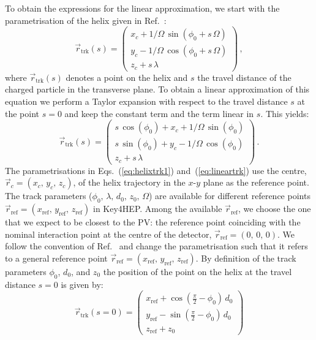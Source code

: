 \documentclass[a4paper,english,11pt]{article}
\newcommand{\trk}{\ensuremath{\textrm{trk}}\xspace}
\newcommand{\refpt}{\ensuremath{\textrm{ref}}\xspace}
\begin{document}
	To obtain the expressions for the linear approximation, we start with the parametrisation of the helix given in Ref.~\cite{Kuhr:1998jk}:
	\begin{equation}
		\vec{r}_{\trk}(s) = \begin{pmatrix}
			x_c + 1/\Omega \, \sin(\phi_0 + s \, \Omega) \\
			y_c - 1/\Omega \, \cos(\phi_0 + s \, \Omega) \\
			z_c + s \, \lambda
		\end{pmatrix} 
		\, ,
		\label{eq:helixtrk1}
	\end{equation}
	where $\vec{r}_{\trk}(s)$ denotes a point on the helix and $s$ the travel distance of the charged particle in the transverse plane.
	To obtain a linear approximation of this equation we perform a Taylor expansion with respect to the travel distance $s$ at the point $s = 0$ and keep the constant term and the term linear in $s$. This yields:
	\begin{equation}
		\vec{r}_{\trk}(s) = \begin{pmatrix}
			s \, \cos(\phi_0) + x_{c} + 1/\Omega \, \sin(\phi_0) \\
			s \, \sin(\phi_0) + y_{c} - 1/\Omega \, \cos(\phi_0) \\
			z_c + s \, \lambda
		\end{pmatrix} 
		\, .
		\label{eq:lineartrk}
	\end{equation} 
The parametrisations in Eqs.~(\ref{eq:helixtrk1}) and~(\ref{eq:lineartrk}) use the centre, $\vec{r}_{c} = (x_{c},\,y_{c},\,z_{c})$, of the helix trajectory in the $x$-$y$ plane as the reference point.
The track parameters ($\phi_{0},\,\lambda,\,d_{0},\,z_{0},\,\Omega$) are available for different reference points $\vec{r}_{\refpt} = (x_{\refpt},\,y_{\refpt},\,z_{\refpt})$ in Key4HEP. Among the available $\vec{r}_{\refpt}$, we choose the one that we expect to be closest to the PV: the reference point coinciding with the nominal interaction point at the centre of the detector, $\vec{r}_{\refpt} = (0,\,0,\,0)$.
We follow the convention of Ref.~\cite{Kramer:2006zz} and change the parametrisation such that it refers to a general reference point $\vec{r}_{\refpt} = (x_{\refpt},\,y_{\refpt},\,z_{\refpt})$. By definition of the track parameters $\phi_{0}$, $d_{0}$, and $z_{0}$ the position of the point on the helix at the travel distance $s=0$ is given by:
\begin{equation}
\vec{r}_{\trk}(s=0) = \begin{pmatrix}
	x_{\refpt} + \cos(\frac{\pi}{2} - \phi_0) \, d_0 \\
	y_{\refpt} - \sin(\frac{\pi}{2} - \phi_0) \, d_0 \\
	z_{\refpt} + z_0
\end{pmatrix} 
\label{eq:trkats0}
\end{equation}  
\end{document}
